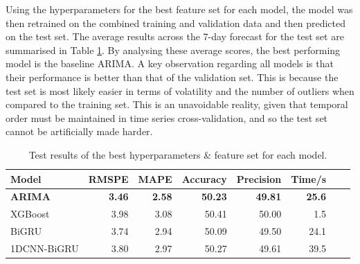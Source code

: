\documentclass[ %
                    author={Raj Dhakan},
                supervisor={Dr. Ayush Joshi},
                    degree={MSc},
                     title={Ethereum Price Prediction using Internal and External Factors},
                  subtitle={},
                      type={},
                      year={2025}]{dissertation}
\begin{document}
Using the hyperparameters for the best feature set for each model, the model was then retrained on the combined training and validation data and then predicted on the test set. The average results across the 7-day forecast for the test set are summarised in Table \ref{tab:test}. By analysing these average scores, the best performing model is the baseline ARIMA. A key observation regarding all models is that their performance is better than that of the validation set. This is because the test set is most likely easier in terms of volatility and the number of outliers when compared to the training set. This is an unavoidable reality, given that temporal order must be maintained in time series cross-validation, and so the test set cannot be artificially made harder.


\begin{table}[htbp]
\centering
\caption{Test results of the best hyperparameters \& feature set for each model.}
\begin{tabular}{lrrrrrrr}
\toprule
\textbf{Model} & \textbf{RMSPE}  & \textbf{MAPE} & \textbf{Accuracy} & \textbf{Precision} & \textbf{Time/s} \\
\midrule
\textbf{ARIMA}         & \textbf{3.46} & \textbf{2.58} & \textbf{50.23} & \textbf{49.81} & \textbf{25.6} \\
XGBoost       & 3.98  & 3.08 & 50.41 & 50.00 &  1.5 \\
BiGRU         & 3.74  & 2.94 & 50.09 & 49.50 & 24.1 \\
1DCNN-BiGRU   & 3.80 & 2.97 & 50.27 & 49.61 & 39.5 \\
\bottomrule
\end{tabular}
\label{tab:test}
\end{table}
\end{document}
